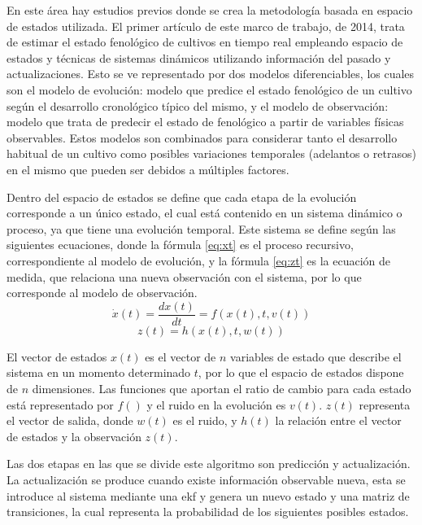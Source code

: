\par En este área hay estudios previos donde se crea la metodología basada en espacio de estados utilizada. El primer artículo \cite{Juanma2014} de este marco de trabajo, de 2014, trata de estimar el estado fenológico de cultivos en tiempo real empleando espacio de estados y técnicas de sistemas dinámicos utilizando información del pasado y actualizaciones. Esto se ve representado por dos modelos diferenciables, los cuales son el modelo de evolución: modelo que predice el estado fenológico de un cultivo según el desarrollo cronológico típico del mismo, y el modelo de observación: modelo que trata de predecir el estado de fenológico a partir de variables físicas observables. Estos modelos son combinados para considerar tanto el desarrollo habitual de un cultivo como posibles variaciones temporales (adelantos o retrasos) en el mismo que pueden ser debidos a múltiples factores. 
\\
\par Dentro del espacio de estados se define que cada etapa de la evolución corresponde a un único estado, el cual está contenido en un sistema dinámico o proceso, ya que tiene una evolución temporal. Este sistema se define según las siguientes ecuaciones, donde la fórmula \ref{eq:xt} es el proceso recursivo, correspondiente al modelo de evolución, y la fórmula \ref{eq:zt} es la ecuación de medida, que relaciona una nueva observación con el sistema, por lo que corresponde al modelo de observación.
\\
\begin{equation} \label{eq:xt}
\dot{x}(t) = \frac{dx(t)}{dt}=f(x(t),t,v(t))
\end{equation}
\begin{equation} \label{eq:zt}
z(t) = h(x(t),t,w(t))
\end{equation}
\par El vector de estados $x(t)$ es el vector de $n$ variables de estado que describe el sistema en un momento determinado $t$, por lo que el espacio de estados dispone de $n$ dimensiones. Las funciones que aportan el ratio de cambio para cada estado está representado por $f()$ y el ruido en la evolución es $v(t)$. $z(t)$ representa el vector de salida, donde $w(t)$ es el ruido, y $h(t)$ la relación entre el vector de estados y la observación $z(t)$.
\\
\par Las dos etapas en las que se divide este algoritmo son predicción y actualización. La actualización se produce cuando existe información observable nueva, esta se introduce al sistema mediante una \gls{ekf} y genera un nuevo estado y una matriz de transiciones, la cual representa la probabilidad de los siguientes posibles estados.
